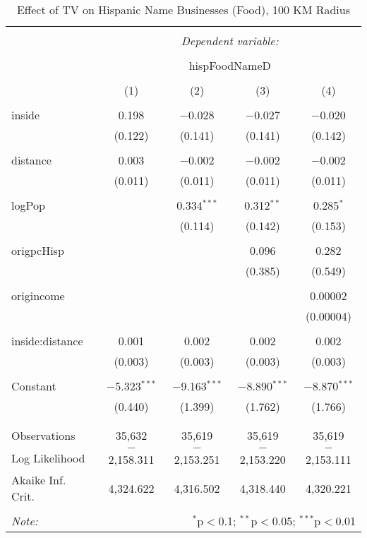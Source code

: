 
\begin{table}[!htbp] \centering 
  \caption{Effect of TV on Hispanic Name Businesses (Food), 100 KM Radius} 
  \label{} 
\begin{tabular}{@{\extracolsep{-5pt}}lcccc} 
\\[-1.8ex]\hline 
\hline \\[-1.8ex] 
 & \multicolumn{4}{c}{\textit{Dependent variable:}} \\ 
\cline{2-5} 
\\[-1.8ex] & \multicolumn{4}{c}{hispFoodNameD} \\ 
\\[-1.8ex] & (1) & (2) & (3) & (4)\\ 
\hline \\[-1.8ex] 
 inside & 0.198 & $-$0.028 & $-$0.027 & $-$0.020 \\ 
  & (0.122) & (0.141) & (0.141) & (0.142) \\ 
  & & & & \\ 
 distance & 0.003 & $-$0.002 & $-$0.002 & $-$0.002 \\ 
  & (0.011) & (0.011) & (0.011) & (0.011) \\ 
  & & & & \\ 
 logPop &  & 0.334$^{***}$ & 0.312$^{**}$ & 0.285$^{*}$ \\ 
  &  & (0.114) & (0.142) & (0.153) \\ 
  & & & & \\ 
 origpcHisp &  &  & 0.096 & 0.282 \\ 
  &  &  & (0.385) & (0.549) \\ 
  & & & & \\ 
 origincome &  &  &  & 0.00002 \\ 
  &  &  &  & (0.00004) \\ 
  & & & & \\ 
 inside:distance & 0.001 & 0.002 & 0.002 & 0.002 \\ 
  & (0.003) & (0.003) & (0.003) & (0.003) \\ 
  & & & & \\ 
 Constant & $-$5.323$^{***}$ & $-$9.163$^{***}$ & $-$8.890$^{***}$ & $-$8.870$^{***}$ \\ 
  & (0.440) & (1.399) & (1.762) & (1.766) \\ 
  & & & & \\ 
\hline \\[-1.8ex] 
Observations & 35,632 & 35,619 & 35,619 & 35,619 \\ 
Log Likelihood & $-$2,158.311 & $-$2,153.251 & $-$2,153.220 & $-$2,153.111 \\ 
Akaike Inf. Crit. & 4,324.622 & 4,316.502 & 4,318.440 & 4,320.221 \\ 
\hline 
\hline \\[-1.8ex] 
\textit{Note:}  & \multicolumn{4}{r}{$^{*}$p$<$0.1; $^{**}$p$<$0.05; $^{***}$p$<$0.01} \\ 
\end{tabular} 
\end{table} 
